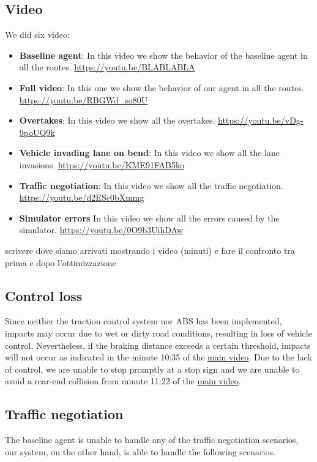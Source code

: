 \documentclass{article}
\begin{document}
\subsection{Video}
We did six video:
\begin{itemize}
    \item \textbf{Baseline agent}: In this video we show the behavior of the baseline agent in all the routes. \url{https://youtu.be/BLABLABLA}
    \item \textbf{Full video}: In this one we show the behavior of our agent in all the routes. \url{https://youtu.be/RBGWd_so80U}
    \item \textbf{Overtakes}: In this video we show all the overtakes. \url{https://youtu.be/vDg-9poUQ9k}
    \item \textbf{Vehicle invading lane on bend}: In this video we show all the lane invasions. \url{https://youtu.be/KME91FAB5ko}
    \item \textbf{Traffic negotiation}: In this video we show all the traffic negotiation. \url{https://youtu.be/d2ESc0bXmmg}
    \item \textbf{Simulator errors} In this video we show all the errors caused by the simulator. \url{https://youtu.be/0O9b3UihDAw}
\end{itemize}
scrivere dove siamo arrivati mostrando i video (minuti) e fare il confronto tra prima e dopo l'ottimizzazione
\subsection{Control loss}
Since neither the traction control system nor ABS has been implemented, impacts may occur due to wet or dirty road conditions, 
resulting in loss of vehicle control. Nevertheless, if the braking distance exceeds a certain threshold, impacts will not occur as 
indicated in the minute 10:35 of the \href{https://youtu.be/RBGWd_so80U?t=635}{main video}. Due to the lack of control, we are unable to stop promptly at a stop sign and we are unable to avoid a rear-end collision from minute 11:22 of the \href{https://youtu.be/RBGWd_so80U?t=682}{main video}.

\subsection{Traffic negotiation}
The baseline agent is unable to handle any of the traffic negotiation scenarios, our system, on the other hand, is able to handle the following scenarios.
\end{document}
